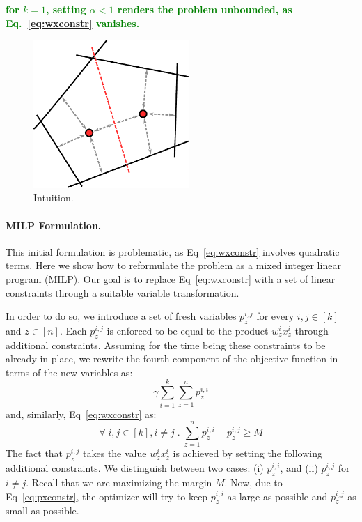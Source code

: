 \documentclass{article}
\renewcommand\[{\begin{equation}}
\renewcommand\]{\end{equation}}
\newcommand{\stefano}[1]{{\bf \textcolor{green}{{\fbox{Stefano:} #1}}}}
\begin{document}
\stefano{for $k=1$, setting $\alpha < 1$  renders the problem unbounded, as
Eq.~\ref{eq:wxconstr} vanishes.}

\begin{figure}[t]
    \begin{center}
        \includegraphics[width=16em]{setmargin}
    \end{center}
    \caption{\label{fig:setmargin} Intuition.}
\end{figure}

\paragraph{MILP Formulation.} This initial formulation is problematic, as
Eq~\ref{eq:wxconstr} involves quadratic terms. Here we show how to reformulate
the problem as a mixed integer linear program (MILP). Our goal is to replace
Eq~\ref{eq:wxconstr} with a set of linear constraints through a suitable
variable transformation.

In order to do so, we introduce a set of fresh variables $p^{i,j}_z$ for every
$i,j\in[k]$ and $z\in[n]$. Each $p^{i,j}_z$ is enforced to be equal to the
product $w^{i}_z x^{i}_z$ through additional constraints. Assuming for the
time being these constraints to be already in place, we rewrite the fourth
component of the objective function in terms of the new variables as:
%
$$ \gamma \sum_{i=1}^k \sum_{z=1}^n p^{i,i}_z $$
%
and, similarly, Eq~\ref{eq:wxconstr} as:
%
\[ \forall \; i, j \in [k], i \neq j \;.\; \sum_{z=1}^n p^{i,i}_z - p^{i,j}_z \ge M \label{eq:pxconstr} \]
%
The fact that $p^{i,j}_z$ takes the value $w^{i}_z x^{i}_z$ is achieved by
setting the following additional constraints. We distinguish between two cases:
(i) $p^{i,i}_z$, and (ii) $p^{i,j}_z$ for $i \ne j$.  Recall that we are
maximizing the margin $M$. Now, due to Eq~\ref{eq:pxconstr}, the optimizer will
try to keep $p^{i,i}_z$ as large as possible and $p^{i,j}_z$ as small as
possible.
\end{document}
